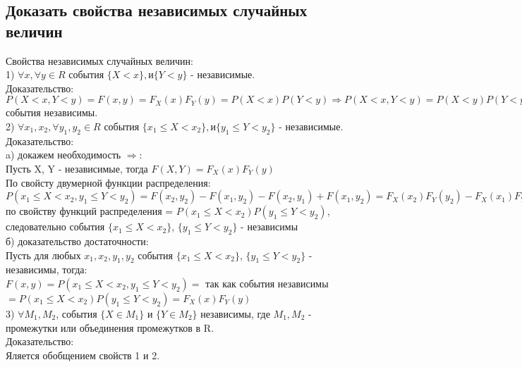 \subsection{Доказать свойства независимых случайных величин}
Свойства независимых случайных величин:\\
1) $\forall x, \forall y \in R$ события $\{X < x\}, и \{Y < y\}$  - независимые.\\
Доказательство:\\
$P(X < x, Y < y) = F(x, y) = F_{X}(x) F_{Y}(y) = P(X < x) P(Y < y) \Rightarrow P(X < x, Y < y) = P(X < y) P(Y < y) \Rightarrow $ события независимы.\\

2) $\forall x_{1}, x_{2}, \forall y_{1}, y_{2} \in R$ события $\{x_{1} \leqslant X < x_{2}\}, и \{y_{1} \leqslant Y < y_{2}\}$  - независимые.\\
Доказательство:\\
a) докажем необходимость $\Rightarrow$:\\
Пусть X, Y - независимые, тогда $F(X, Y) = F_{X}(x) F_{Y}(y)$\\
По свойсту двумерной функции распределения:
$P(x_{1} \leqslant X < x_{2}, y_{1} \leqslant Y < y_{2}) = F(x_{2}, y_{2}) - F(x_{1}, y_{2}) - F(x_{2}, y_{1}) + F(x_{1}, y_{2}) = F_{X}(x_{2})F_{Y}(y_{2}) - F_{X}(x_{1})F_{Y}(y_{2}) - F_{X}(x_{2})F_{Y}(y_{1}) + F_{X}(x_{1})F_{Y}(y_{1}) = [F_{X}(x_{2}) - F_{X}(y_{1})][F_{Y}(y_{2} - )F_{Y}(y_{1})] = $ по свойству функций распределения = $ P(x_{1} \leqslant X < x_{2}) P(y_{1} \leqslant Y < y_{2}) $, следовательно события $\{x_{1} \leqslant X < x_{2}\}$, $\{y_{1} \leqslant Y < y_{2}\}$ - независимы\\
б) доказательство достаточности:\\
Пусть для любых $x_{1}, x_{2}, y_{1}, y_{2}$ события $\{x_{1} \leqslant X < x_{2}\}$, $\{y_{1} \leqslant Y < y_{2}\}$ - независимы, тогда:\\
$F(x, y) = P(x_{1} \leqslant X < x_{2}, y_{1} \leqslant Y < y_{2}) = $ так как события независимы $ = P(x_{1} \leqslant X < x_{2}) P(y_{1} \leqslant Y < y_{2}) = F_{X}(x) F_{Y}(y)$\\

3) $\forall M_{1}, M_{2}$, события $\{X \in M_{1}\}$ и $\{Y \in M_{2}\}$ независимы, где $M_{1}, M_{2}$ - промежутки или объединения промежутков в R.\\
Доказательство:\\
Яляется обобщением свойств 1 и 2.\\

